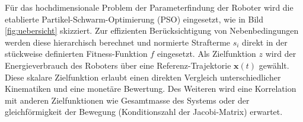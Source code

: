 \documentclass[fleqn,a4paper,10pt]{article}
\newcommand{\bm}[1]{\mathbf{#1}}
\renewenvironment{figure}
  {\par\vspace{6pt}\noindent\minipage{\linewidth}}
  {\endminipage\par\vspace{6pt}}
\begin{document}
Für das hochdimensionale Problem der Parameterfindung der Roboter wird die etablierte Partikel-Schwarm-Optimierung (PSO) eingesetzt, wie in Bild\,\ref{fig:uebersicht} skizziert.
Zur effizienten Berücksichtigung von Nebenbedingungen werden diese hierarchisch berechnet und normierte Strafterme $s_i$ direkt in der stückweise definierten Fitness-Funktion $f$ eingesetzt.
Als Zielfunktion $z$ wird der Energieverbrauch des Roboters über eine Referenz-Trajektorie $\bm{x}(t)$ gewählt.
Diese skalare Zielfunktion erlaubt einen direkten Vergleich unterschiedlicher Kinematiken und eine monetäre Bewertung.
Des Weiteren wird eine Korrelation mit anderen Zielfunktionen wie Gesamtmasse des Systems oder der gleichförmigkeit der Bewegung (Konditionszahl der Jacobi-Matrix) erwartet.

\begin{figure}
	\centering
    
    \label{fig:uebersicht}
\end{figure}

\end{document}
